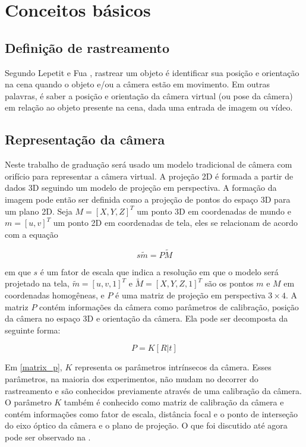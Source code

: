 \chapter{Conceitos básicos}

\section{Definição de rastreamento}

Segundo Lepetit e Fua \cite{lepetit}, rastrear um objeto é identificar sua posição e orientação na cena quando o objeto e/ou a câmera estão em movimento. Em outras palavras, é saber a posição e orientação da câmera virtual (ou pose da câmera) em relação ao objeto presente na cena, dada uma entrada de imagem ou vídeo.

\section{Representação da câmera}

Neste trabalho de graduação será usado um modelo tradicional de câmera com orifício para representar a câmera virtual. A projeção 2D é formada a partir de dados 3D seguindo um modelo de projeção em perspectiva. A formação da imagem pode então ser definida como a projeção de pontos do espaço 3D para um plano 2D. Seja $M = [X, Y, Z]^T$ um ponto 3D em coordenadas de mundo e $m = [u, v]^T$ um ponto 2D em coordenadas de tela, eles se relacionam de acordo com a equação

\begin{equation}
\label{projection_eq}
s\tilde{m} = P\tilde{M}
\end{equation}

em que $s$ é um fator de escala que indica a resolução em que o modelo será projetado na tela, $\tilde{m} = [u, v, 1]^T$ e $\tilde{M} = [X, Y, Z, 1]^T$ são os pontos $m$ e $M$ em coordenadas homogêneas, e $P$ é uma matriz de projeção em perspectiva $3 \times 4$. A matriz $P$ contém informações da câmera como parâmetros de calibração, posição da câmera no espaço 3D e orientação da câmera. Ela pode ser decomposta da seguinte forma:

\begin{equation}
\label{matrix_p}
P = K[R | t]
\end{equation}

Em \eqref{matrix_p}, $K$ representa os parâmetros intrínsecos da câmera. Esses parâmetros, na maioria dos experimentos, não mudam no decorrer do rastreamento e são conhecidos previamente através de uma calibração da câmera. O parâmetro $K$ também é conhecido como matriz de calibração da câmera \cite{lepetit} e contém informações como fator de escala, distância focal e o ponto de interseção do eixo óptico da câmera e o plano de projeção. O que foi discutido até agora pode ser observado na .

